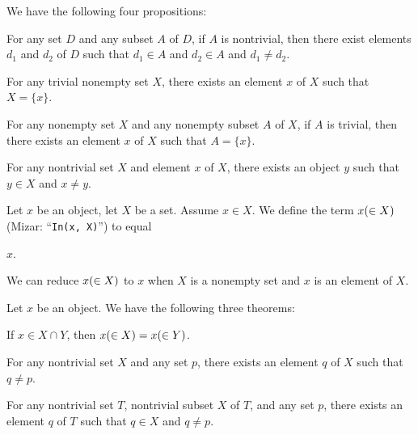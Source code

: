 \documentclass{article}
\begin{document}
We have the following four propositions:
\begin{thm}
\item\label{subset1:45} For any set $D$ and any subset $A$ of $D$, if
  $A$ is nontrivial, then there exist elements $d_{1}$ and $d_{2}$ of
  $D$ such that $d_{1}\in A$ and $d_{2}\in A$ and $d_{1}\neq d_{2}$.
\item\label{subset1:46} For any trivial nonempty set $X$, there exists
  an element $x$ of $X$ such that $X=\{x\}$.
\item\label{subset1:47} For any nonempty set $X$ and any nonempty
  subset $A$ of $X$, if $A$ is trivial, then there exists an element $x$
  of $X$ such that $A=\{x\}$.
\item\label{subset1:48} For any nontrivial set $X$ and element $x$ of $X$,
  there exists an object $y$ such that $y\in X$ and $x\neq y$.
\end{thm}

\begin{definition}
Let $x$ be an object, let $X$ be a set. Assume $x\in X$. We define the
term $x(\in X)$ (Mizar: ``\verb#In(x, X)#'') to equal
\begin{defn}
\item $x$.
\end{defn}
We can reduce $x(\in X)$ to $x$ when $X$ is a nonempty set and $x$ is
an element of $X$.
\end{definition}

Let $x$ be an object. We have the following three theorems:
\begin{thm}
\item\label{subset1:49} If $x\in X\cap Y$, then $x(\in X)=x(\in Y)$.
\item\label{subset1:50} For any nontrivial set $X$ and any set $p$,
  there exists an element $q$ of $X$ such that $q\neq p$.
\item\label{subset1:51} For any nontrivial set $T$, nontrivial subset
  $X$ of $T$, and any set $p$, there exists an element $q$ of $T$ such
  that $q\in X$ and $q\neq p$. 
\end{thm}
\end{document}

